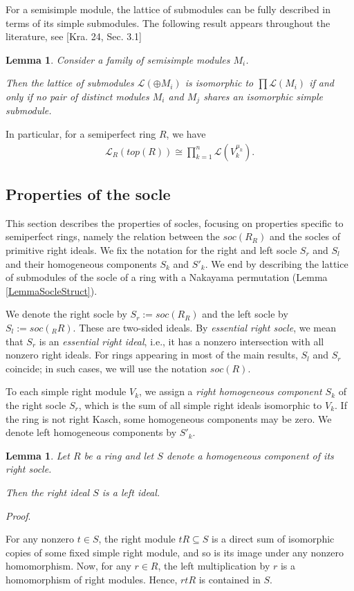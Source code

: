 \documentclass[11pt]{article}
\theoremstyle{plain}
\newtheorem{Lemma}[veta]{Lemma}
\theoremstyle{remark}
\theoremstyle{plain}
\newenvironment{Proof}{
  \par\medskip\noindent
  \textit{Proof}.
}{
\newline
\rightline{$\qedsymbol$}
}
\begin{document}
For a semisimple module, the lattice of submodules can be fully described in terms of its simple submodules. The following result appears throughout the literature, see [Kra. 24, Sec. 3.1]
\begin{Lemma}\label{LemmaUrelated}
    Consider a family of semisimple modules $M_i$.

    Then the lattice of submodules $\mathcal{L}(\oplus M_i)$ is isomorphic to $\prod\mathcal{L}(M_i)$ if and only if no pair of distinct modules $M_i$ and $M_j$ shares an isomorphic simple submodule.
\end{Lemma}

In particular, for a semiperfect ring $R$, we have
\begin{gather*}
    \mathcal{L}_R(top(R))\cong \prod_{k=1}^n \mathcal{L}(V_k^{\mu_k}).
\end{gather*}

\subsection{Properties of the socle} \label{secsempsocle}

This section describes the properties of socles, focusing on properties specific to semiperfect rings, namely the relation between the $soc(R_R)$ and the socles of primitive right ideals. We fix the notation for the right and left socle $S_r$ and $S_l$ and their homogeneous components $S_k$ and $S'_k$. We end by describing the lattice of submodules of the socle of a ring with a Nakayama permutation (Lemma \ref{LemmaSocleStruct}).

\smallskip

We denote the right socle by $S_r:=soc(R_R)$ and the left socle by $S_l:=soc(_RR)$. These are two-sided ideals. By \textit{essential right socle}, we mean that $S_r$ is an \textit{essential right ideal}, i.e., it has a nonzero intersection with all nonzero right ideals. For rings appearing in most of the main results, $S_l$ and $S_r$ coincide; in such cases, we will use the notation $soc(R)$.

To each simple right module $V_k$, we assign a \textit{right homogeneous component $S_k$} of the right socle $S_r$, which is the sum of all simple right ideals isomorphic to $V_k$. If the ring is not right Kasch, some homogeneous components may be zero. We denote left homogeneous components by $S'_k$.

\begin{Lemma}
    Let $R$ be a ring and let $S$ denote a homogeneous component of its right socle.

    Then the right ideal $S$ is a left ideal. 
\end{Lemma}
\begin{Proof}
     For any nonzero $t\in S$, the right module $tR\subseteq S$ is a direct sum of isomorphic copies of some fixed simple right module, and so is its image under any nonzero homomorphism. Now, for any $r\in R$, the left multiplication by $r$ is a homomorphism of right modules. Hence,  $rtR$ is contained in $S$.
\end{Proof}
\end{document}

